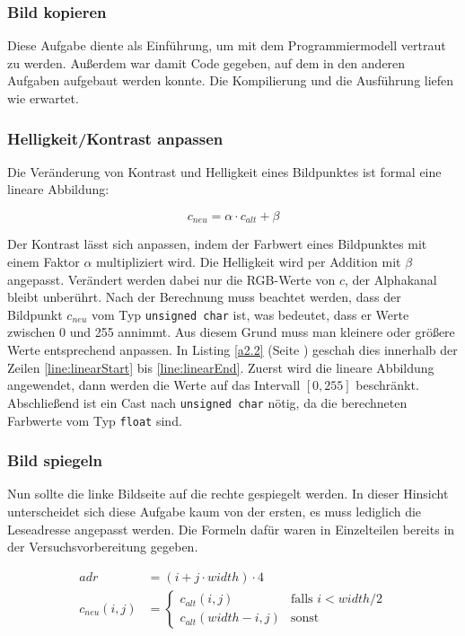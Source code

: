 \documentclass[12pt,a4paper]{scrartcl}
\begin{document}
\subsubsection{Bild kopieren}
Diese Aufgabe diente als Einf\"uhrung, um mit dem Programmiermodell vertraut zu werden.
Au\ss erdem war damit Code gegeben, auf dem in den anderen Aufgaben aufgebaut werden konnte.
Die Kompilierung und die Ausf\"uhrung liefen wie erwartet.

\subsubsection{Helligkeit/Kontrast anpassen}
Die Ver\"anderung von Kontrast und Helligkeit eines Bildpunktes ist formal eine lineare Abbildung:

\begin{equation}\label{eq:linKernel}
    c_{neu} = \alpha \cdot c_{alt} + \beta
\end{equation}

Der Kontrast l\"asst sich anpassen, indem der Farbwert eines Bildpunktes mit einem Faktor $\alpha$ multipliziert wird.
Die Helligkeit wird per Addition mit $\beta$ angepasst.
Ver\"andert werden dabei nur die RGB-Werte von $c$, der Alphakanal bleibt unber\"uhrt.
Nach der Berechnung muss beachtet werden, dass der Bildpunkt $c_{neu}$ vom Typ \texttt{unsigned char} ist, was bedeutet, dass er Werte zwischen 0 und 255 annimmt.
Aus diesem Grund muss man kleinere oder gr\"o\ss ere Werte entsprechend anpassen.
In Listing \ref{a2.2} (Seite \pageref{a2.2}) geschah dies innerhalb der Zeilen \ref{line:linearStart} bis \ref{line:linearEnd}.
Zuerst wird die lineare Abbildung angewendet, dann werden die Werte auf das Intervall $[0,255]$ beschr\"ankt.
Abschlie\ss end ist ein Cast nach \texttt{unsigned char} n\"otig, da die berechneten Farbwerte vom Typ \texttt{float} sind.

\subsubsection{Bild spiegeln}
Nun sollte die linke Bildseite auf die rechte gespiegelt werden.
In dieser Hinsicht unterscheidet sich diese Aufgabe kaum von der ersten, es muss lediglich die Leseadresse angepasst werden.
Die Formeln daf\"ur waren in Einzelteilen bereits in der Versuchsvorbereitung gegeben.

\begin{align}
    adr & = (i + j \cdot width) \cdot 4 \nonumber\\
    c_{neu}(i,j) & =
        \begin{cases}
            c_{alt}(i,j) & \text{falls } i < width/2\\
            c_{alt}(width-i,j) & \text{sonst }
        \end{cases} \nonumber 
\end{align}
\end{document}

